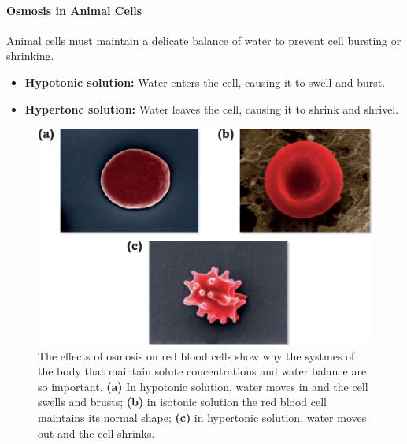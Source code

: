 \paragraph{Osmosis in Animal Cells}
Animal cells must maintain a delicate balance of water to prevent cell bursting or shrinking.
\begin{itemize}
    \item \textbf{Hypotonic solution:} Water enters the cell, causing it to swell and burst.
    \item \textbf{Hypertonc solution:} Water leaves the cell, causing it to shrink and shrivel.
\end{itemize}
\begin{figure}[H]
    \centering
    \includegraphics[scale=0.12]{Biology/2A/Images/2A-3-2.png}
    \caption{The effects of osmosis on red blood cells show why the systmes of the body that maintain solute concentrations and
    water balance are so important. \textbf{(a)} In hypotonic solution, water moves in and the cell swells and brusts;
    \textbf{(b)} in isotonic solution the red blood cell maintains its normal shape; \textbf{(c)} in hypertonic solution, water
    moves out and the cell shrinks.}
\end{figure}

